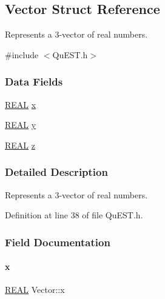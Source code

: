 \hypertarget{structVector}{}\subsection{Vector Struct Reference}
\label{structVector}


Represents a 3-\/vector of real numbers.  




{\ttfamily \#include $<$Qu\+E\+S\+T.\+h$>$}

\subsubsection*{Data Fields}
\begin{DoxyCompactItemize}
\item 
\mbox{\hyperlink{QuEST__precision_8h_a4b654506f18b8bfd61ad2a29a7e38c25}{R\+E\+AL}} \mbox{\hyperlink{structVector_aac7abe171ba4bada50ed72acba6259fc}{x}}
\item 
\mbox{\hyperlink{QuEST__precision_8h_a4b654506f18b8bfd61ad2a29a7e38c25}{R\+E\+AL}} \mbox{\hyperlink{structVector_a375ca805d4c808a53d7c4e0c737ae3de}{y}}
\item 
\mbox{\hyperlink{QuEST__precision_8h_a4b654506f18b8bfd61ad2a29a7e38c25}{R\+E\+AL}} \mbox{\hyperlink{structVector_ad4e863651be7d6b7e2b28cd7445a0ccf}{z}}
\end{DoxyCompactItemize}


\subsubsection{Detailed Description}
Represents a 3-\/vector of real numbers. 

Definition at line 38 of file Qu\+E\+S\+T.\+h.



\subsubsection{Field Documentation}
\mbox{\label{structVector_aac7abe171ba4bada50ed72acba6259fc}} 
\paragraph{\texorpdfstring{x}{x}}
{\footnotesize\ttfamily \mbox{\hyperlink{QuEST__precision_8h_a4b654506f18b8bfd61ad2a29a7e38c25}{R\+E\+AL}} Vector\+::x}




